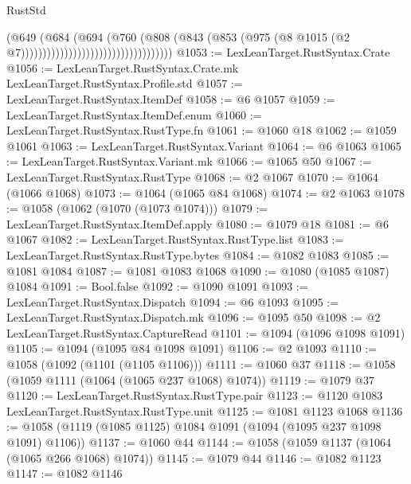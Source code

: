 \begin{lexlean}{RustStd}
\begin{coremodule}
                                                      (@649
                                                        (@684
                                                          (@694
                                                            (@760
                                                              (@808
                                                                (@843
                                                                  (@853
                                                                    (@975
                                                                      (@8
                                                                        @1015
                                                                        (@2
                                                                          @7)))))))))))))))))))))))))))))))))))
@1053 := LexLeanTarget.RustSyntax.Crate
@1056 := LexLeanTarget.RustSyntax.Crate.mk LexLeanTarget.RustSyntax.Profile.std
@1057 := LexLeanTarget.RustSyntax.ItemDef
@1058 := @6 @1057
@1059 := LexLeanTarget.RustSyntax.ItemDef.enum
@1060 := LexLeanTarget.RustSyntax.RustType.fn
@1061 := @1060 @18
@1062 := @1059 @1061
@1063 := LexLeanTarget.RustSyntax.Variant
@1064 := @6 @1063
@1065 := LexLeanTarget.RustSyntax.Variant.mk
@1066 := @1065 @50
@1067 := LexLeanTarget.RustSyntax.RustType
@1068 := @2 @1067
@1070 := @1064 (@1066 @1068)
@1073 := @1064 (@1065 @84 @1068)
@1074 := @2 @1063
@1078 := @1058 (@1062 (@1070 (@1073 @1074)))
@1079 := LexLeanTarget.RustSyntax.ItemDef.apply
@1080 := @1079 @18
@1081 := @6 @1067
@1082 := LexLeanTarget.RustSyntax.RustType.list
@1083 := LexLeanTarget.RustSyntax.RustType.bytes
@1084 := @1082 @1083
@1085 := @1081 @1084
@1087 := @1081 @1083 @1068
@1090 := @1080 (@1085 @1087) @1084
@1091 := Bool.false
@1092 := @1090 @1091
@1093 := LexLeanTarget.RustSyntax.Dispatch
@1094 := @6 @1093
@1095 := LexLeanTarget.RustSyntax.Dispatch.mk
@1096 := @1095 @50
@1098 := @2 LexLeanTarget.RustSyntax.CaptureRead
@1101 := @1094 (@1096 @1098 @1091)
@1105 := @1094 (@1095 @84 @1098 @1091)
@1106 := @2 @1093
@1110 := @1058 (@1092 (@1101 (@1105 @1106)))
@1111 := @1060 @37
@1118 := @1058 (@1059 @1111 (@1064 (@1065 @237 @1068) @1074))
@1119 := @1079 @37
@1120 := LexLeanTarget.RustSyntax.RustType.pair
@1123 := @1120 @1083 LexLeanTarget.RustSyntax.RustType.unit
@1125 := @1081 @1123 @1068
@1136 := @1058 (@1119 (@1085 @1125) @1084 @1091 (@1094 (@1095 @237 @1098 @1091) @1106))
@1137 := @1060 @44
@1144 := @1058 (@1059 @1137 (@1064 (@1065 @266 @1068) @1074))
@1145 := @1079 @44
@1146 := @1082 @1123
@1147 := @1082 @1146

\end{coremodule}
\end{lexlean}
